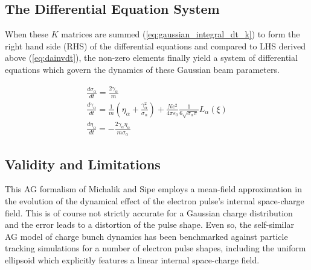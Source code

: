 \subsection{The Differential Equation System}

When these $K$ matrices are summed (\ref{eq:gaussian_integral_dt_k}) to form the right hand side (RHS) of the differential equations and compared to LHS derived above (\ref{eq:dainvdt}), the non-zero elements finally yield a system of differential equations which govern the dynamics of these Gaussian beam parameters.

\begin{subequations} \label{eq:ag_original}
\begin{gather}
  \frac{d\sigma_{\alpha}}{dt} = \frac{2\gamma_{\alpha}}{m} \\
  \frac{d\gamma_{\alpha}}{dt} = \frac{1}{m} \left(\eta_{\alpha} + \frac{\gamma_{\alpha}^2}{\sigma_{\alpha}} \right) 
    + \frac{N e^2}{4\pi\varepsilon_0} \frac{1}{6 \sqrt{\sigma_{\alpha}\pi}} L_{\alpha}(\xi)\\
  \frac{d\eta_{\alpha}}{dt} = - \frac{2 \gamma_{\alpha} \eta_{\alpha}}{m \sigma_{\alpha}}
\end{gather}
\end{subequations}

\subsection{Validity and Limitations}

This AG formalism of Michalik and Sipe\cite{michalik_analytic_2006} employs a mean-field approximation in the evolution of the dynamical effect of the electron pulse's internal space-charge field.
This is of course not strictly accurate for a Gaussian charge distribution and the error leads to a distortion of the pulse shape.
Even so, the self-similar AG model of charge bunch dynamics has been benchmarked against particle tracking simulations for a number of electron pulse shapes,\cite{michalik_analytic_2006,michalik_evolution_2009} including the uniform ellipsoid which explicitly features a linear internal space-charge field.\cite{luiten_how_2004} 
